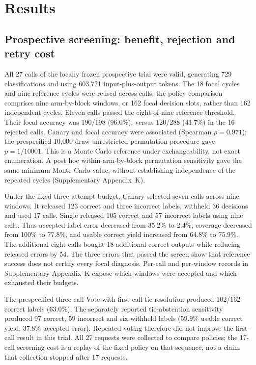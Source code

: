 \documentclass[11pt,a4paper]{article}
\begin{document}
\section{Results}\label{sec:results}
\subsection{Prospective screening: benefit, rejection and retry cost}\label{sec:prospective_results}
All 27 calls of the locally frozen prospective trial were valid, generating 729 classifications and using 603{,}721 input-plus-output tokens. The 18 focal cycles and nine reference cycles were reused across calls; the policy comparison comprises nine arm-by-block windows, or 162 focal decision slots, rather than 162 independent cycles. Eleven calls passed the eight-of-nine reference threshold. Their focal accuracy was 190/198 (96.0\%), versus 120/288 (41.7\%) in the 16 rejected calls. Canary and focal accuracy were associated (Spearman $\rho=0.971$); the prespecified 10{,}000-draw unrestricted permutation procedure gave $p=1/10001$. This is a Monte Carlo reference under exchangeability, not exact enumeration. A post hoc within-arm-by-block permutation sensitivity gave the same minimum Monte Carlo value, without establishing independence of the repeated cycles (Supplementary Appendix~K).

Under the fixed three-attempt budget, Canary selected seven calls across nine windows. It released 123 correct and three incorrect labels, withheld 36 decisions and used 17 calls. Single released 105 correct and 57 incorrect labels using nine calls. Thus accepted-label error decreased from 35.2\% to 2.4\%, coverage decreased from 100\% to 77.8\%, and usable correct yield increased from 64.8\% to 75.9\%. The additional eight calls bought 18 additional correct outputs while reducing released errors by 54. The three errors that passed the screen show that reference success does not certify every focal diagnosis. Per-call and per-window records in Supplementary Appendix~K expose which windows were accepted and which exhausted their budgets.

The prespecified three-call Vote with first-call tie resolution produced 102/162 correct labels (63.0\%). The separately reported tie-abstention sensitivity produced 97 correct, 59 incorrect and six withheld labels (59.9\% usable correct yield; 37.8\% accepted error). Repeated voting therefore did not improve the first-call result in this trial. All 27 requests were collected to compare policies; the 17-call screening cost is a replay of the fixed policy on that sequence, not a claim that collection stopped after 17 requests.
\end{document}
